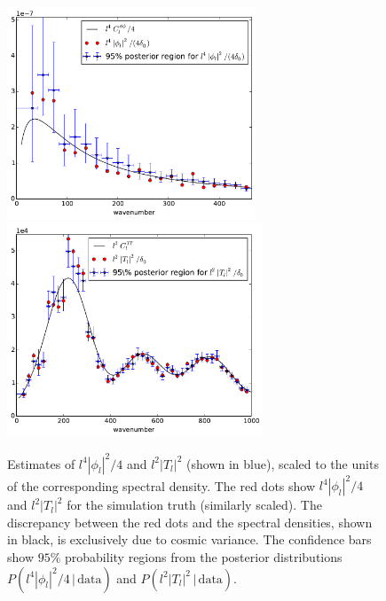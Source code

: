 \documentclass[iop,revtex4,apj,onecolumn]{emulateapj}
\begin{document}
\begin{figure}
\begin{center}
{\includegraphics[height=2.5in]{figure8a.pdf}}%
{\includegraphics[height=2.5in]{figure8b.pdf}}
\end{center}
\caption{\label{p spec fig}
Estimates of $l^4|\phi_l|^2/4$  and $l^2|T_l|^2$ (shown in blue), scaled to the units of the corresponding spectral density. The red dots show $l^4|\phi_l|^2/4$  and $l^2|T_l|^2$ for the simulation truth (similarly scaled). The discrepancy between the red dots and the spectral densities, shown in black, is exclusively due to cosmic variance. The confidence bars show $95\%$ probability regions from the posterior distributions $P(l^4|\phi_l|^2/4\,|\,\text{data})$ and $P(l^2|T_l|^2\,|\,\text{data})$.
}
\end{figure}
\end{document}
